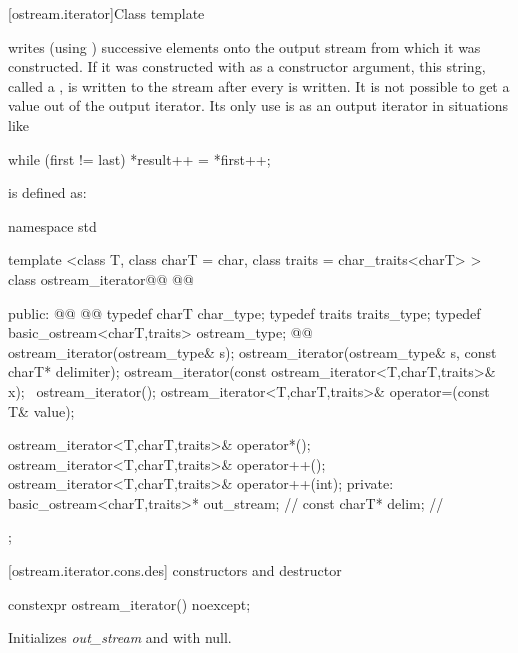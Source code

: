 %
\begin{itemdescr}
\pnum
\returns
{}
\end{itemdescr}

[ostream.iterator]{Class template }

\pnum
{}%
writes (using
)
successive elements onto the output stream from which it was constructed.
If it was constructed with
as a constructor argument, this string, called a
,
is written to the stream after every
is written.
It is not possible to get a value out of the output iterator.
Its only use is as an output iterator in situations like

\begin{codeblock}
while (first != last)
  *result++ = *first++;
\end{codeblock}

\pnum
{}
is defined as:

\begin{codeblock}
namespace std {
  template <class T, class charT = char, class traits = char_traits<charT> >
  class ostream_iterator@\removed{:}@
    @@ {
  public:
    @@
    @@
    typedef charT char_type;
    typedef traits traits_type;
    typedef basic_ostream<charT,traits> ostream_type;
    @@
    ostream_iterator(ostream_type& s);
    ostream_iterator(ostream_type& s, const charT* delimiter);
    ostream_iterator(const ostream_iterator<T,charT,traits>& x);
   ~ostream_iterator();
    ostream_iterator<T,charT,traits>& operator=(const T& value);

    ostream_iterator<T,charT,traits>& operator*();
    ostream_iterator<T,charT,traits>& operator++();
    ostream_iterator<T,charT,traits>& operator++(int);
  private:
    basic_ostream<charT,traits>* out_stream;  // \expos
    const charT* delim;                       // \expos
  };
}
\end{codeblock}

[ostream.iterator.cons.des]{ constructors and destructor}

\begin{addedblock}
%
\begin{itemdecl}
constexpr ostream_iterator() noexcept;
\end{itemdecl}

\begin{itemdescr}
\pnum
\effects
Initializes \textit{out_stream} and  with null.
\end{itemdescr}
\end{addedblock}

